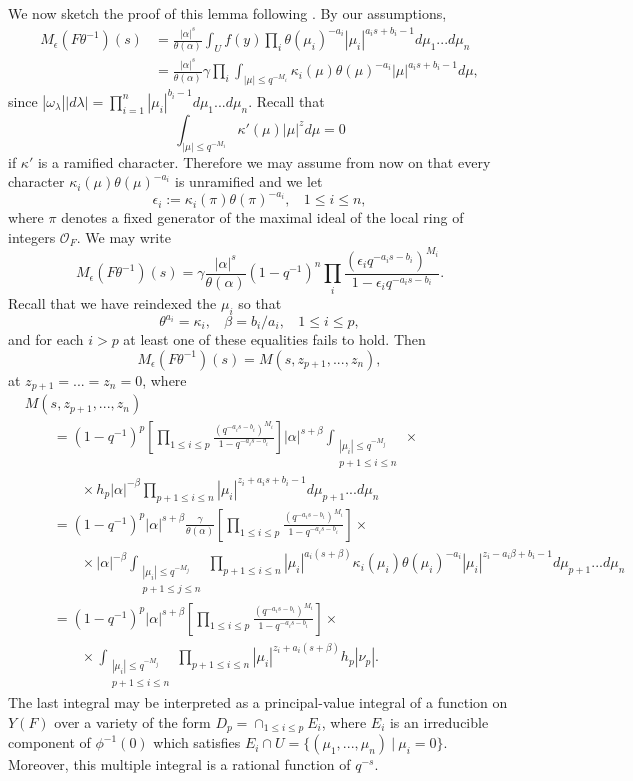 \documentclass[12pt,letterpaper]{amsart}
\begin{document}
We now sketch the proof of this lemma following \cite{La83}.
By our assumptions,
\[
\begin{split}
M_\epsilon (F\theta^{-1})(s)
&=\frac{|\alpha|^s}{\theta(\alpha)}
\int_Uf(y)\prod_i\theta(\mu_i)^{-a_i}|\mu_i|^{a_is+b_i-1}
d\mu_1...d\mu_n\\
&=\frac{|\alpha|^s}{\theta(\alpha)}\gamma
\prod_i\int_{|\mu|\leq q^{-M_i}}
\kappa_i(\mu)\theta(\mu)^{-a_i}|\mu|^{a_is+b_i-1}d\mu,
\end{split}
\tag{5.8}
\]
since $|\omega_\lambda ||d\lambda |
=\prod_{i=1}^n|\mu_i|^{b_i-1}d\mu_1...d\mu_n$.
Recall that
\[
\int_{|\mu|\leq q^{-M_i}}
\kappa'(\mu)|\mu|^zd\mu =0
\]
if $\kappa'$ is a ramified character. Therefore we may assume
from now on that every character $\kappa_i(\mu)\theta(\mu)^{-a_i}$
is unramified and we let
\[
\epsilon_i:=\kappa_i(\pi)\theta(\pi)^{-a_i},\ \ \ \
1\leq i\leq n,
\]
where $\pi$ denotes a fixed generator of the maximal ideal
of the local ring of integers ${\mathcal O}_F$. We may write
\[
M_\epsilon (F\theta^{-1})(s)
=\gamma\frac{|\alpha|^s}{\theta(\alpha)}
(1-q^{-1})^n\prod_i
\frac{(\epsilon_iq^{-a_is-b_i})^{M_i}}{1-\epsilon_iq^{-a_is-b_i}}.
\]
Recall that we have reindexed the $\mu_i$ so that
\[
\theta^{a_i}=\kappa_i,\ \ \ \ \beta=b_i/a_i,\ \ \ \
1\leq i\leq p,
\]
and for each $i>p$ at least one of these equalities fails to hold.
Then
\[
M_\epsilon (F\theta^{-1})(s)
=M(s,z_{p+1},...,z_n),
\]
at $z_{p+1}=...=z_n=0$, where
\[
\begin{split}
&M(s,z_{p+1},...,z_n)\\
&\quad\quad =(1-q^{-1})^p
[\prod_{1\leq i\leq p}
\frac{(q^{-a_is-b_i})^{M_i}}{1-q^{-a_is-b_i}}]|\alpha|^{s+\beta}
\int_{\substack{ |\mu_i|\leq q^{-M_j}\\ p+1\leq i\leq n}}
\times\\
&\quad\quad\quad\quad \times
h_p|\alpha|^{-\beta}
\prod_{p+1\leq i\leq n}|\mu_i|^{z_i+a_is+b_i-1}
d\mu_{p+1}...d\mu_n\\
&\quad\quad
=(1-q^{-1})^p|\alpha|^{s+\beta}\frac{\gamma}{\theta(\alpha)}
[\prod_{1\leq i\leq p}
\frac{(q^{-a_is-b_i})^{M_i}}{1-q^{-a_is-b_i}}]\times \\
&\quad\quad \quad\quad \times
|\alpha|^{-\beta}\int_{\substack{ |\mu_i|\leq q^{-M_j}\\ p+1\leq j\leq n}}
\prod_{p+1\leq i\leq n}|\mu_i|^{a_i(s+\beta)}
\kappa_i(\mu_i)\theta(\mu_i)^{-a_i}|\mu_i|^{z_i-a_i\beta+b_i-1}
d\mu_{p+1}...d\mu_n\\
&\quad\quad
=(1-q^{-1})^p|\alpha|^{s+\beta}[\prod_{1\leq i\leq p}
\frac{(q^{-a_is-b_i})^{M_i}}{1-q^{-a_is-b_i}}]\times \\
&\quad\quad \quad\quad \times
\int_{\substack{ |\mu_i|\leq q^{-M_j}\\ p+1\leq i\leq n}}
\prod_{p+1\leq i\leq n}|\mu_i|^{z_i+a_i(s+\beta)}h_p|\nu_p|.
\end{split}
\tag{5.9}
\]
The last integral may be interpreted as a principal-value
integral of a function on $Y(F)$ over a variety of the form
$D_p=\cap_{1\leq i\leq p}E_i$, where $E_i$ is an irreducible
component of $\phi^{-1}(0)$ which satisfies
$E_i\cap U=\{(\mu_1,...,\mu_n)\ |\ \mu_i=0\}$. Moreover, this
multiple integral is a rational function of $q^{-s}$.
\end{document}
